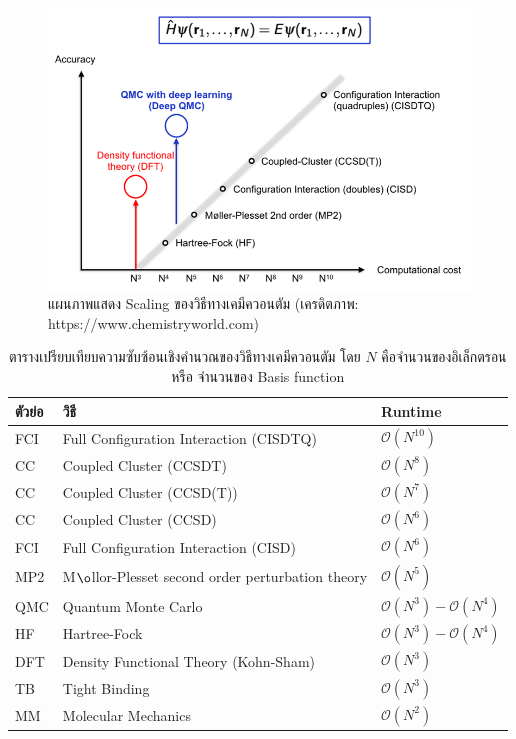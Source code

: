\begin{figure}[H]
    \centering
    \includegraphics[width=0.9\linewidth]{fig/qm_scaling.png}
    \caption{แผนภาพแสดง Scaling ของวิธีทางเคมีควอนตัม (เครดิตภาพ: https://www.chemistryworld.com)}
    \label{fig:qm_scaling}
\end{figure}

\begin{table}[H]
    \centering
    \caption{ตารางเปรียบเทียบความซับซ้อนเชิงคำนวณของวิธีทางเคมีควอนตัม\autocite{rupp2015} โดย $N$ คือจำนวนของอิเล็กตรอนหรือ%
    จำนวนของ Basis function}
    \label{tab:qm_complx}
    \small
    \begin{tabular}{lll}\toprule
    ตัวย่อ &วิธี &Runtime \\\midrule
    FCI &Full Configuration Interaction (CISDTQ) &$\mathcal{O}(N^{10})$ \\
    CC &Coupled Cluster (CCSDT) &$\mathcal{O}(N^{8})$ \\
    CC &Coupled Cluster (CCSD(T)) &$\mathcal{O}(N^{7})$ \\
    CC &Coupled Cluster (CCSD) &$\mathcal{O}(N^{6})$ \\
    FCI &Full Configuration Interaction (CISD) &$\mathcal{O}(N^{6})$ \\
    MP2 &M$\o$llor-Plesset second order perturbation theory &$\mathcal{O}(N^{5})$ \\
    QMC &Quantum Monte Carlo &$\mathcal{O}(N^{3}) - \mathcal{O}(N^{4})$ \\
    HF &Hartree-Fock &$\mathcal{O}(N^{3}) - \mathcal{O}(N^{4})$ \\
    DFT &Density Functional Theory (Kohn-Sham) &$\mathcal{O}(N^{3})$ \\
    TB &Tight Binding &$\mathcal{O}(N^{3})$ \\
    MM &Molecular Mechanics &$\mathcal{O}(N^{2})$ \\
    \bottomrule
    \end{tabular}
\end{table}

